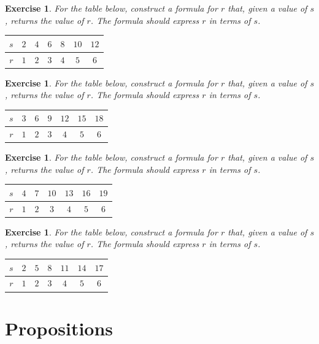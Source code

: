 \documentclass{book}
\newcounter{ekcounter}%
\theoremstyle{ekimcustom}
\newtheorem{exercise}[ekcounter]{Exercise}
\begin{document}
\begin{exercise}
For the table below, construct a formula for $r$ that, given a value of $s$, returns the value of $r$. The formula should express $r$ in terms of $s$.
\vskip1pt
\begin{tabular}{c||c|c|c|c|c|c}
$s$ & $2$ & $4$ & $6$ & $8$ & $10$ & $12$ \\ \hline
$r$ & $1$ & $2$ & $3$ & $4$ & $5$ & $6$ \\ 
\end{tabular}
\end{exercise}

\begin{exercise}
For the table below, construct a formula for $r$ that, given a value of $s$, returns the value of $r$. The formula should express $r$ in terms of $s$.
\vskip1pt
\begin{tabular}{c||c|c|c|c|c|c}
$s$ & $3$ & $6$ & $9$ & $12$ & $15$ & $18$ \\ \hline
$r$ & $1$ & $2$ & $3$ & $4$ & $5$ & $6$ \\ 
\end{tabular}
\end{exercise}

\begin{exercise}
For the table below, construct a formula for $r$ that, given a value of $s$, returns the value of $r$. The formula should express $r$ in terms of $s$.
\vskip1pt
\begin{tabular}{c||c|c|c|c|c|c}
$s$ & $4$ & $7$ & $10$ & $13$ & $16$ & $19$ \\ \hline
$r$ & $1$ & $2$ & $3$ & $4$ & $5$ & $6$ \\ 
\end{tabular}
\end{exercise}

\begin{exercise}
For the table below, construct a formula for $r$ that, given a value of $s$, returns the value of $r$. The formula should express $r$ in terms of $s$.
\vskip1pt
\begin{tabular}{c||c|c|c|c|c|c}
$s$ & $2$ & $5$ & $8$ & $11$ & $14$ & $17$ \\ \hline
$r$ & $1$ & $2$ & $3$ & $4$ & $5$ & $6$ \\ 
\end{tabular}
\end{exercise}





\chapter{Propositions}\label{chapter:propositions}
\end{document}
